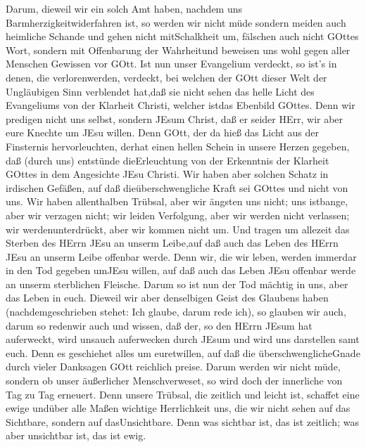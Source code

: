  Darum, dieweil wir ein solch Amt haben, nachdem uns
Barmherzigkeitwiderfahren ist, so werden wir nicht müde 
sondern meiden auch heimliche Schande und gehen nicht mitSchalkheit um,
fälschen auch nicht GOttes Wort, sondern mit Offenbarung der Wahrheitund
beweisen uns wohl gegen aller Menschen Gewissen vor GOtt. 
Ist nun unser Evangelium verdeckt, so ist's in denen, die
verlorenwerden, verdeckt,  bei welchen der GOtt dieser Welt
der Ungläubigen Sinn verblendet hat,daß sie nicht sehen das helle Licht
des Evangeliums von der Klarheit Christi, welcher istdas Ebenbild
GOttes.  Denn wir predigen nicht uns selbst, sondern JEsum
Christ, daß er seider HErr, wir aber eure Knechte um JEsu willen.
 Denn GOtt, der da hieß das Licht aus der Finsternis
hervorleuchten, derhat einen hellen Schein in unsere Herzen gegeben, daß
(durch uns) entstünde dieErleuchtung von der Erkenntnis der Klarheit
GOttes in dem Angesichte JEsu Christi.  Wir haben aber
solchen Schatz in irdischen Gefäßen, auf daß dieüberschwengliche Kraft
sei GOttes und nicht von uns.  Wir haben allenthalben
Trübsal, aber wir ängsten uns nicht; uns istbange, aber wir verzagen
nicht;  wir leiden Verfolgung, aber wir werden nicht
verlassen; wir werdenunterdrückt, aber wir kommen nicht um.
 Und tragen um allezeit das Sterben des HErrn JEsu an
unserm Leibe,auf daß auch das Leben des HErrn JEsu an unserm Leibe
offenbar werde.  Denn wir, die wir leben, werden immerdar
in den Tod gegeben umJEsu willen, auf daß auch das Leben JEsu offenbar
werde an unserm sterblichen Fleische.  Darum so ist nun der
Tod mächtig in uns, aber das Leben in euch.  Dieweil wir
aber denselbigen Geist des Glaubens haben (nachdemgeschrieben stehet:
Ich glaube, darum rede ich), so glauben wir auch, darum so redenwir auch
 und wissen, daß der, so den HErrn JEsum hat auferweckt,
wird unsauch auferwecken durch JEsum und wird uns darstellen samt euch.
 Denn es geschiehet alles um euretwillen, auf daß die
überschwenglicheGnade durch vieler Danksagen GOtt reichlich preise.
 Darum werden wir nicht müde, sondern ob unser äußerlicher
Menschverweset, so wird doch der innerliche von Tag zu Tag erneuert.
 Denn unsere Trübsal, die zeitlich und leicht ist, schaffet
eine ewige undüber alle Maßen wichtige Herrlichkeit  uns,
die wir nicht sehen auf das Sichtbare, sondern auf dasUnsichtbare. Denn
was sichtbar ist, das ist zeitlich; was aber unsichtbar ist, das ist
ewig.

